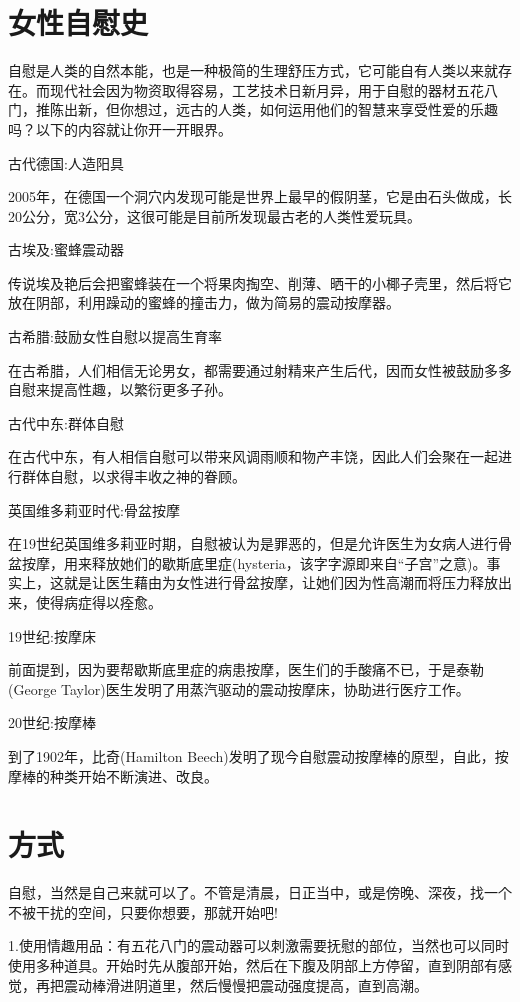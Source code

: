 \documentclass[12pt,UTF8]{ctexbook}
\begin{document}
\section{女性自慰史}

自慰是人类的自然本能，也是一种极简的生理舒压方式，它可能自有人类以来就存在。而现代社会因为物资取得容易，工艺技术日新月异，用于自慰的器材五花八门，推陈出新，但你想过，远古的人类，如何运用他们的智慧来享受性爱的乐趣吗？以下的内容就让你开一开眼界。

古代德国:人造阳具

2005年，在德国一个洞穴内发现可能是世界上最早的假阴茎，它是由石头做成，长20公分，宽3公分，这很可能是目前所发现最古老的人类性爱玩具。

古埃及:蜜蜂震动器

传说埃及艳后会把蜜蜂装在一个将果肉掏空、削薄、晒干的小椰子壳里，然后将它放在阴部，利用躁动的蜜蜂的撞击力，做为简易的震动按摩器。

古希腊:鼓励女性自慰以提高生育率

在古希腊，人们相信无论男女，都需要通过射精来产生后代，因而女性被鼓励多多自慰来提高性趣，以繁衍更多子孙。

古代中东:群体自慰

在古代中东，有人相信自慰可以带来风调雨顺和物产丰饶，因此人们会聚在一起进行群体自慰，以求得丰收之神的眷顾。

英国维多莉亚时代:骨盆按摩

在19世纪英国维多莉亚时期，自慰被认为是罪恶的，但是允许医生为女病人进行骨盆按摩，用来释放她们的歇斯底里症(hysteria，该字字源即来自“子宫”之意)。事实上，这就是让医生藉由为女性进行骨盆按摩，让她们因为性高潮而将压力释放出来，使得病症得以痊愈。

19世纪:按摩床

前面提到，因为要帮歇斯底里症的病患按摩，医生们的手酸痛不已，于是泰勒(George Taylor)医生发明了用蒸汽驱动的震动按摩床，协助进行医疗工作。

20世纪:按摩棒

到了1902年，比奇(Hamilton Beech)发明了现今自慰震动按摩棒的原型，自此，按摩棒的种类开始不断演进、改良。

\section{方式}

自慰，当然是自己来就可以了。不管是清晨，日正当中，或是傍晚、深夜，找一个不被干扰的空间，只要你想要，那就开始吧!

1.使用情趣用品：有五花八门的震动器可以刺激需要抚慰的部位，当然也可以同时使用多种道具。开始时先从腹部开始，然后在下腹及阴部上方停留，直到阴部有感觉，再把震动棒滑进阴道里，然后慢慢把震动强度提高，直到高潮。
\end{document}
